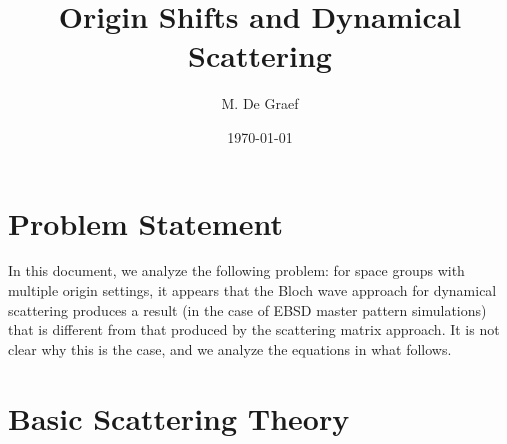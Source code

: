 \documentclass[12pt]{amsart}
\title{Origin Shifts and Dynamical Scattering}
\author{M. De Graef}
\date{\today} %
\begin{document}
\maketitle

\section{Problem Statement}

In this document, we analyze the following problem: for space groups with multiple 
origin settings, it appears that the Bloch wave approach for dynamical scattering 
produces a result (in the case of EBSD master pattern simulations) that is different
from that produced by the scattering matrix approach.  It is not clear why this is 
the case, and we analyze the equations in what follows.

\section{Basic Scattering Theory}
\end{document}
